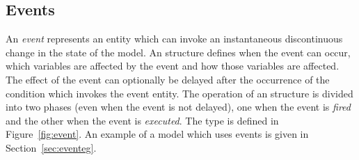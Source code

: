 \documentclass[10pt]{cekarticle}
\newcommand{\vref}[1]{\ref{#1}}
\begin{document}
%
%
%
%
%
%
%
%
%
%
%
%
%

\subsection{Events}
\label{sec:events}

An \emph{event} represents an entity which can invoke an
instantaneous discontinuous change in the state of the model. An
 structure defines when the event can occur, which
variables are affected by the event and how those variables are
affected.  The effect of the event can optionally be delayed after
the occurrence of the condition which invokes the event entity.
The operation of an  structure is divided into two
phases (even when the event is not delayed), one when the event is
\emph{fired} and the other when the event is \emph{executed}. The
 type is defined in Figure~\vref{fig:event}.  An
example of a model which uses events is given in
Section~\ref{sec:eventeg}.
\end{document}
